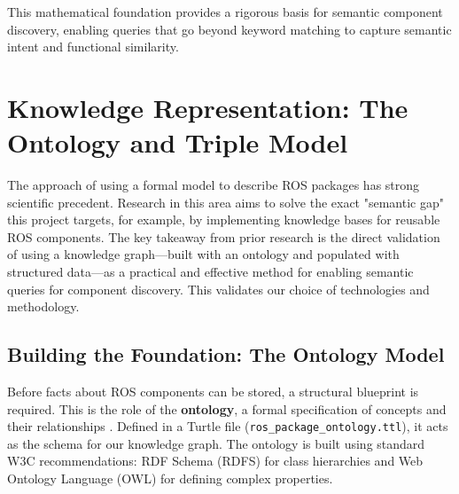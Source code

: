 \documentclass[rnd]{mas_proposal}
\begin{document}
This mathematical foundation provides a rigorous basis for semantic component discovery, enabling queries that go beyond keyword matching to capture semantic intent and functional similarity.

\section{Knowledge Representation: The Ontology and Triple Model}
The approach of using a formal model to describe ROS packages has strong scientific precedent. Research in this area aims to solve the exact "semantic gap" this project targets, for example, by implementing knowledge bases for reusable ROS components. The key takeaway from prior research is the direct validation of using a knowledge graph—built with an ontology and populated with structured data—as a practical and effective method for enabling semantic queries for component discovery. This validates our choice of technologies and methodology.

\subsection{Building the Foundation: The Ontology Model}
Before facts about ROS components can be stored, a structural blueprint is required. This is the role of the \textbf{ontology}, a formal specification of concepts and their relationships \citep{gruber1993translation}. Defined in a Turtle file (\texttt{ros_package_ontology.ttl}), it acts as the schema for our knowledge graph. The ontology is built using standard W3C recommendations: RDF Schema (RDFS) for class hierarchies and Web Ontology Language (OWL) for defining complex properties.
\end{document}
